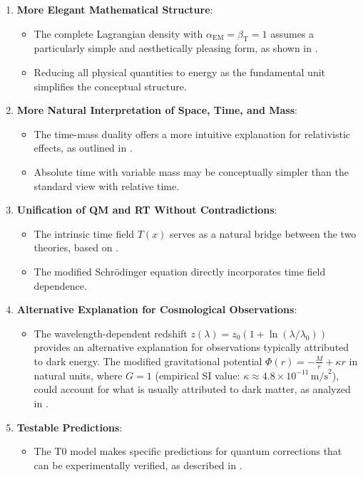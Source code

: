 \documentclass[12pt,a4paper]{article}
\newcommand{\Tfield}{T(x)}
\newcommand{\alphaEM}{\alpha_{\text{EM}}}
\newcommand{\betaT}{\beta_{\text{T}}}
\begin{document}
	\begin{enumerate}
		\item \textbf{More Elegant Mathematical Structure}:
		\begin{itemize}
			\item The complete Lagrangian density with $\alphaEM = \betaT = 1$ assumes a particularly simple and aesthetically pleasing form, as shown in \cite{pascher_formalismen_2025_en}.
			\item Reducing all physical quantities to energy as the fundamental unit simplifies the conceptual structure.
		\end{itemize}
		
		\item \textbf{More Natural Interpretation of Space, Time, and Mass}:
		\begin{itemize}
			\item The time-mass duality offers a more intuitive explanation for relativistic effects, as outlined in \cite{pascher_perspektive_2025_en}.
			\item Absolute time with variable mass may be conceptually simpler than the standard view with relative time.
		\end{itemize}
		
		\item \textbf{Unification of QM and RT Without Contradictions}:
		\begin{itemize}
			\item The intrinsic time field $\Tfield$ serves as a natural bridge between the two theories, based on \cite{pascher_erweiterung_2025_en}.
			\item The modified Schrödinger equation directly incorporates time field dependence.
		\end{itemize}
		
		\item \textbf{Alternative Explanation for Cosmological Observations}:
		\begin{itemize}
			\item The wavelength-dependent redshift $z(\lambda) = z_0(1 + \ln(\lambda/\lambda_0))$ provides an alternative explanation for observations typically attributed to dark energy.
The modified gravitational potential $\Phi(r) = -\frac{M}{r} + \kappa r$ in natural units, where $G = 1$ (empirical SI value: $\kappa \approx 4.8 \times 10^{-11} \, \text{m/s}^2$), could account for what is usually attributed to dark matter, as analyzed in \cite{pascher_galaxies_2025_en}.


		\end{itemize}
		
		\item \textbf{Testable Predictions}:
		\begin{itemize}
			\item The T0 model makes specific predictions for quantum corrections that can be experimentally verified, as described in \cite{pascher_params_2025_en}.
		\end{itemize}
	\end{enumerate}
	
\end{document}
